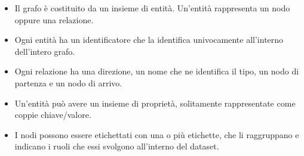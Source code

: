 \begin{itemize}
  \item Il grafo è costituito da un insieme di entità. Un'entità rappresenta un nodo oppure una relazione.
  
  \item Ogni entità ha un identificatore che la identifica univocamente all'interno dell'intero grafo.
  
  \item Ogni relazione ha una direzione, un nome che ne identifica il tipo, un nodo di partenza e un nodo di arrivo.
  
  \item Un'entità può avere un insieme di proprietà, solitamente rappresentate come coppie chiave/valore.
  
  \item I nodi possono essere etichettati con una o più etichette, che li raggruppano e indicano i ruoli che essi svolgono all'interno del dataset.
\end{itemize}